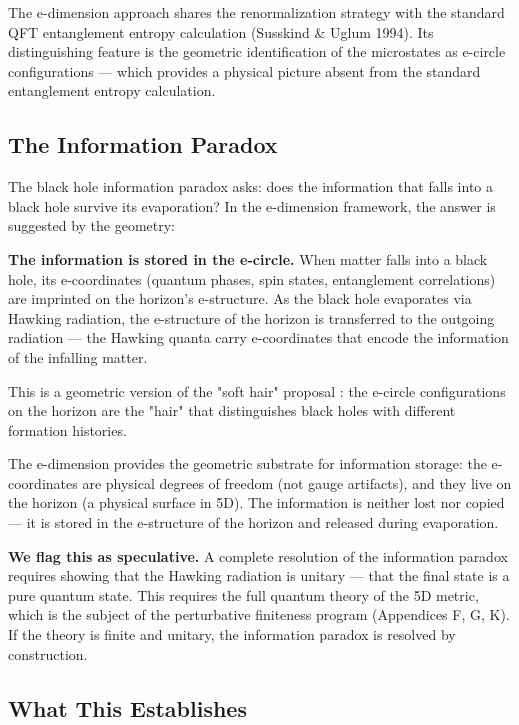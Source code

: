 \documentclass[aps,prd,preprint,superscriptaddress,longbibliography,floatfix]{revtex4-2}
\theoremstyle{remark}
\begin{document}
The e-dimension approach shares the renormalization strategy with the standard QFT entanglement entropy calculation (Susskind \& Uglum 1994). Its distinguishing feature is the geometric identification of the microstates as e-circle configurations --- which provides a physical picture absent from the standard entanglement entropy calculation.



\subsection{The Information Paradox}

The black hole information paradox asks: does the information that falls into a black hole survive its evaporation? In the e-dimension framework, the answer is suggested by the geometry:

\textbf{The information is stored in the e-circle.} When matter falls into a black hole, its e-coordinates (quantum phases, spin states, entanglement correlations) are imprinted on the horizon's e-structure. As the black hole evaporates via Hawking radiation, the e-structure of the horizon is transferred to the outgoing radiation --- the Hawking quanta carry e-coordinates that encode the information of the infalling matter.

This is a geometric version of the "soft hair" proposal \cite{HawkingPerryStrominger2016}: the e-circle configurations on the horizon are the "hair" that distinguishes black holes with different formation histories.

The e-dimension provides the geometric substrate for information storage: the e-coordinates are physical degrees of freedom (not gauge artifacts), and they live on the horizon (a physical surface in 5D). The information is neither lost nor copied --- it is stored in the e-structure of the horizon and released during evaporation.

\textbf{We flag this as speculative.} A complete resolution of the information paradox requires showing that the Hawking radiation is unitary --- that the final state is a pure quantum state. This requires the full quantum theory of the 5D metric, which is the subject of the perturbative finiteness program (Appendices F, G, K). If the theory is finite and unitary, the information paradox is resolved by construction.



\subsection{What This Establishes}
\end{document}
